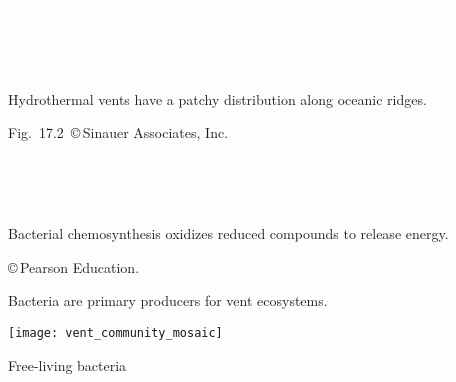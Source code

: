 \documentclass[t]{beamer}
\begin{document}

{
\begin{frame}[t]

	\vspace*{3\baselineskip}

	\hspace*{65mm}\hangpara\parbox{49mm}{\raggedright \large\textcolor{white}{%
	What are hydrothermal vent ecosystems?\\[\baselineskip]
How are they unique compared to the rest of the deep sea habitat?}%
}

	\vfilll

	\hfill \tiny \textcolor{white}{Ocean Networks Canada, Flickr Creative Commons.}
\end{frame}
}
%
{
\begin{frame}[b]{Hydrothermal vents have a patchy distribution along oceanic ridges.}

 \tiny \hfill Fig.~17.2~\copyright\,Sinauer Associates, Inc.
\end{frame}
}
%
{
\begin{frame}[b]{\textcolor{white}{Super-heated water has reduced compounds like .}}

\tiny\hfill\textcolor{white}{Ocean Networks Canada, Flickr Creative Commons.}
\end{frame}
}
%
{
\begin{frame}[b]{Bacterial chemosynthesis oxidizes reduced compounds to release energy.}

\hfill \tiny \copyright\,Pearson Education.
\end{frame}
}
%
\begin{frame}[t]{Bacteria are primary producers for vent ecosystems.}

\vspace*{-\baselineskip}

	\begin{multicols}{2}
		{\centering
		\texttt{[image: vent\_community\_mosaic]}\par}

	\columnbreak

		\hangpara Free-living bacteria

		\hangpara {}

	\end{multicols}

\end{frame}
\end{document}
